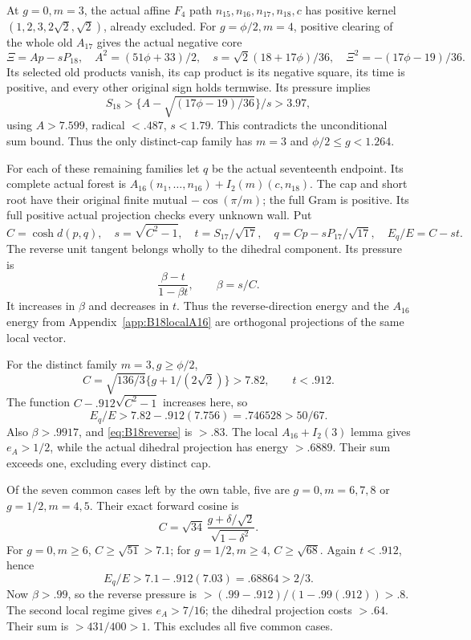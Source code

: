 \documentclass[11pt]{article}
\theoremstyle{definition}
\theoremstyle{remark}
\begin{document}
At \(g=0,\allowbreak m=3\), the actual affine \(F_4\) path
\(n_{15},\allowbreak n_{16},\allowbreak n_{17},\allowbreak n_{18},\allowbreak c\) has positive kernel
\((1,2,3,2\sqrt2,\sqrt2)\), already excluded.
For \(g=\phi/2,\allowbreak m=4\), positive clearing of the whole old
\(A_{17}\) gives the actual negative core
\[
 \Xi=Ap-sP_{18},\quad
 A^2=(51\phi+33)/2,\quad s=\sqrt2(18+17\phi)/36,\quad
 \Xi^2=-(17\phi-19)/36 .
\]
Its selected old products vanish, its cap product is its negative
square, its time is positive, and every other original sign holds
termwise. Its pressure implies
\[
 S_{18}>\{A-\sqrt{(17\phi-19)/36}\}/s>3.97,
\]
using \(A>7.599\), radical \(<.487\), \(s<1.79\).
This contradicts the unconditional sum bound.
Thus the only distinct-cap family has \(m=3\) and
\(\phi/2\leq g<1.264\).

For each of these remaining families let \(q\) be the actual
seventeenth endpoint. Its complete actual forest is
\(A_{16}(n_1,\ldots,n_{16})+I_2(m)(c,n_{18})\).
The cap and short root have their original finite mutual
\(-\cos(\pi/m)\); the full Gram is positive.
Its full positive actual projection checks every unknown wall.
Put
\[
 C=\cosh d(p,q),\quad s=\sqrt{C^2-1},\quad
 t=S_{17}/\sqrt{17},\quad
 q=Cp-sP_{17}/\sqrt{17},\quad E_q/E=C-st .
\]
The reverse unit tangent belongs wholly to the dihedral component.
Its pressure is
\begin{equation}\label{eq:B18reverse}
 \frac{\beta-t}{1-\beta t},\qquad \beta=s/C .
\end{equation}
It increases in \(\beta\) and decreases in \(t\).
Thus the reverse-direction energy and the \(A_{16}\) energy
from Appendix~\ref{app:B18localA16} are orthogonal projections
of the same local vector.

For the distinct family \(m=3,g\geq\phi/2\),
\[
 C=\sqrt{136/3}\{g+1/(2\sqrt2)\}>7.82,\qquad t<.912.
\]
The function \(C-.912\sqrt{C^2-1}\) increases here, so
\[
 E_q/E>7.82-.912(7.756)=.746528>50/67 .
\]
Also \(\beta>.9917\), and \eqref{eq:B18reverse} is \(>.83\).
The local \(A_{16}+I_2(3)\) lemma gives \(e_A>1/2\), while
the actual dihedral projection has energy \(>.6889\).
Their sum exceeds one, excluding every distinct cap.

Of the seven common cases left by the own table, five are
\(g=0,m=6,7,8\) or \(g=1/2,m=4,5\).
Their exact forward cosine is
\[
 C=\sqrt{34}\,\frac{g+\delta/\sqrt2}{\sqrt{1-\delta^2}} .
\]
For \(g=0,m\geq6\), \(C\geq\sqrt{51}>7.1\);
for \(g=1/2,m\geq4\), \(C\geq\sqrt{68}\).
Again \(t<.912\), hence
\[
 E_q/E>7.1-.912(7.03)=.68864>2/3 .
\]
Now \(\beta>.99\), so the reverse pressure is
\(>(.99-.912)/(1-.99(.912))>.8\).
The second local regime gives \(e_A>7/16\); the dihedral
projection costs \(>.64\). Their sum is \(>431/400>1\).
This excludes all five common cases.
\end{document}
